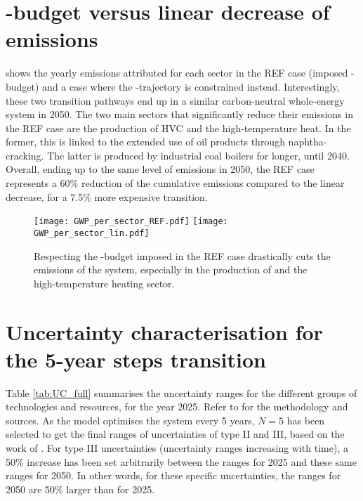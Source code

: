 \section{-budget versus linear decrease of emissions}
\label{app:CO2_budget}

 shows the yearly emissions attributed for each sector in the REF case (\ie imposed -budget) and a case where the -trajectory is constrained instead. Interestingly, these two transition pathways end up in a similar carbon-neutral whole-energy system in 2050. The two main sectors that significantly reduce their emissions in the REF case are the production of \gls{HVC} and the high-temperature heat. In the former, this is linked to the extended use of oil products through naphtha-cracking. The latter is produced by industrial coal boilers for longer, until 2040. Overall, ending up to the same level of emissions in 2050, the REF case represents a 60\% reduction of the cumulative emissions compared to the linear decrease, for a 7.5\% more expensive transition.

\begin{figure}[htbp!]
\centering
\texttt{[image: GWP\_per\_sector\_REF.pdf]}
\texttt{[image: GWP\_per\_sector\_lin.pdf]}
\caption{Respecting the -budget imposed in the REF case drastically cuts the emissions of the system, especially in the production of  and the high-temperature heating sector.}
\label{fig:app_CO2_REF_lin}
\end{figure}

\section{Uncertainty characterisation for the 5-year steps transition} 
\label{app:UC_full}
Table \ref{tab:UC_full} summarises the uncertainty ranges for the different groups of technologies and resources, for the year 2025. Refer to \cite{Moret2017, Moret2017PhDThesis} for the methodology and sources. As the model optimises the system every 5 years, $N=5$ has been selected to get the final ranges of uncertainties of type II and III, based on the work of \citet{Moret2017PhDThesis}. For type III uncertainties (\ie uncertainty ranges increasing with time), a 50\% increase has been set arbitrarily between the ranges for 2025 and these same ranges for 2050. In other words, for these specific uncertainties, the ranges for 2050 are 50\% larger than for 2025.

